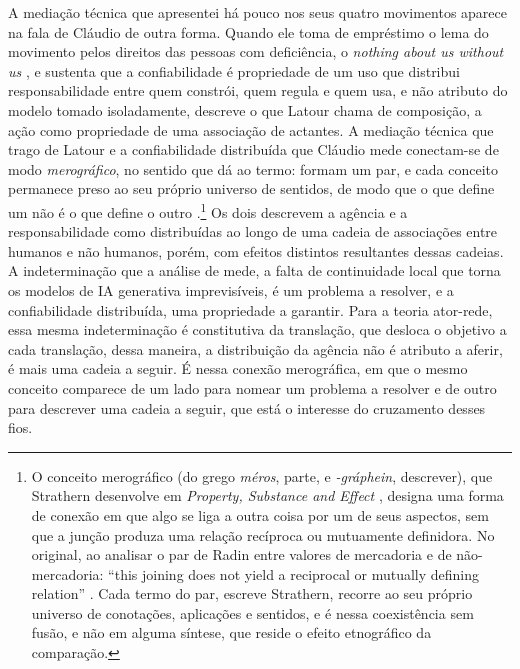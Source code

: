 A mediação técnica que apresentei há pouco nos seus quatro movimentos aparece na fala de Cláudio de outra forma. Quando ele toma de empréstimo o lema do movimento pelos direitos das pessoas com deficiência, o \textit{nothing about us without us} \parencite{Pinhanez2026Seminar}, e sustenta que a confiabilidade é propriedade de um uso que distribui responsabilidade entre quem constrói, quem regula e quem usa, e não atributo do modelo tomado isoladamente, descreve o que Latour chama de composição, a ação como propriedade de uma associação de actantes. A mediação técnica que trago de Latour e a confiabilidade distribuída que Cláudio mede conectam-se de modo \textit{merográfico}, no sentido que \textcite{strathern2000pse} dá ao termo: formam um par, e cada conceito permanece preso ao seu próprio universo de sentidos, de modo que o que define um não é o que define o outro \parencite[p.~248]{strathern2000pse}.\footnote{O conceito merográfico (do grego \textit{méros}, parte, e \textit{-gráphein}, descrever), que Strathern desenvolve em \textit{Property, Substance and Effect} \parencite{strathern2000pse}, designa uma forma de conexão em que algo se liga a outra coisa por um de seus aspectos, sem que a junção produza uma relação recíproca ou mutuamente definidora. No original, ao analisar o par de Radin entre valores de mercadoria e de não-mercadoria: \enquote{this joining does not yield a reciprocal or mutually defining relation} \parencite[p.~248]{strathern2000pse}. Cada termo do par, escreve Strathern, recorre ao seu próprio universo de conotações, aplicações e sentidos, e é nessa coexistência sem fusão, e não em alguma síntese, que reside o efeito etnográfico da comparação.} Os dois descrevem a agência e a responsabilidade como distribuídas ao longo de uma cadeia de associações entre humanos e não humanos, porém, com efeitos distintos resultantes dessas cadeias. A indeterminação que a análise de \textcite{Pinhanez2025Small} mede, a falta de continuidade local que torna os modelos de IA generativa imprevisíveis, é um problema a resolver, e a confiabilidade distribuída, uma propriedade a garantir. Para a teoria ator-rede, essa mesma indeterminação é constitutiva da translação, que desloca o objetivo a cada translação, dessa maneira, a distribuição da agência não é atributo a aferir, é mais uma cadeia a seguir. É nessa conexão merográfica, em que o mesmo conceito comparece de um lado para nomear um problema a resolver e de outro para descrever uma cadeia a seguir, que está o interesse do cruzamento desses fios.

